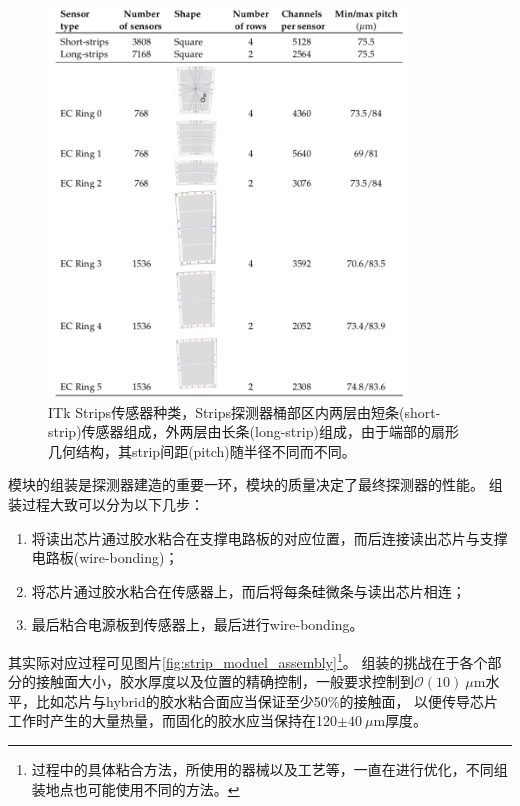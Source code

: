 \begin{figure}[h]
\centering
 \includegraphics[width=0.85\textwidth]{fig/strips_sensor_overview.png}
 \caption{ITk Strips传感器种类\cite{Collaboration:2017mtb}，Strips探测器桶部区内两层由短条(short-strip)传感器组成，外两层由长条(long-strip)组成，由于端部的扇形几何结构，其strip间距(pitch)随半径不同而不同。}
 \label{fig:strip_sensor_overview}
\end{figure}
模块的组装是探测器建造的重要一环，模块的质量决定了最终探测器的性能。
组装过程大致可以分为以下几步：
\begin{enumerate}
 \item 将读出芯片通过胶水粘合在支撑电路板的对应位置，而后连接读出芯片与支撑电路板(wire-bonding)；
 \item 将芯片通过胶水粘合在传感器上，而后将每条硅微条与读出芯片相连；
 \item 最后粘合电源板到传感器上，最后进行wire-bonding。
\end{enumerate}
其实际对应过程可见图片\ref{fig:strip_moduel_assembly}\footnote{过程中的具体粘合方法，所使用的器械以及工艺等，一直在进行优化，不同组装地点也可能使用不同的方法。}。
组装的挑战在于各个部分的接触面大小，胶水厚度以及位置的精确控制，一般要求控制到$\mathcal{O}(10)~\mu\text{m}$水平，比如芯片与hybrid的胶水粘合面应当保证至少50\%的接触面，
以便传导芯片工作时产生的大量热量，而固化的胶水应当保持在120$\pm40~\mu\text{m}$厚度。
